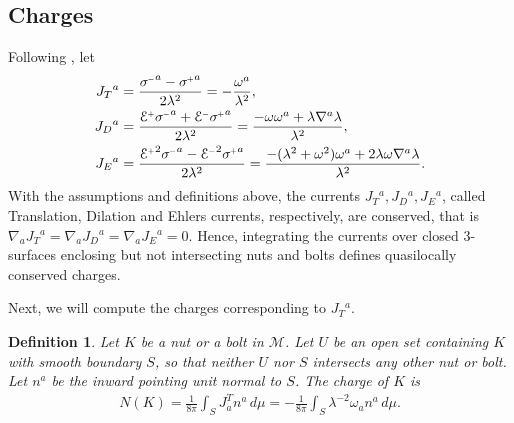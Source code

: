 \documentclass[a4paper,10pt,reqno]{amsart}
\newcommand{\cM}{\mathcal{M}}
\theoremstyle{plain}
\newtheorem{definition}[thm]{Definition}
\renewcommand{\P}[1]{{{#1}^{\hspace{-.5pt}\scaleto{+}{4pt}}}}
\newcommand{\M}[1]{{{#1}^{\hspace{-.5pt}\scaleto{-}{4pt}}}}
\def\Ecal{\mathcal{E}}
\numberwithin{equation}{section}
\begin{document}
\subsection{Charges} 

Following \cite[\S 5]{gibbons:hawking:1979}, let 
\begin{subequations}\label{eq:currents}
\begin{align}
J_{T}{}^{a}={}&\frac{\M{\sigma}^{a} -  \P{\sigma}^{a}}{2 \lambda^2} = - \frac{\omega^a}{\lambda^2}, \label{eq:JT-def} \\
J_{D}{}^{a}={}&\frac{\P{\Ecal} \M{\sigma}^{a} + \M{\Ecal} \P{\sigma}^{a}}{2 \lambda^2} = \frac{-\omega \omega^a + \lambda \nabla^a\lambda}{\lambda^2},\\
J_{E}{}^{a}={}&\frac{\P{\Ecal}^2 \M{\sigma}^{a} -  \M{\Ecal}^2 \P{\sigma}^{a}}{2 \lambda^2} = \frac{-(\lambda^2 + \omega^2)\omega^a + 2\lambda\omega\nabla^a\lambda}{\lambda^2} .
\end{align}
\end{subequations}
With the assumptions and definitions above, the currents $J_{T}{}^{a}, J_{D}{}^{a}, J_{E}{}^{a}$, called Translation, Dilation and Ehlers currents, respectively, are conserved, that is $\nabla_a J_{T}{}^{a} = \nabla_a J_{D}{}^{a} = \nabla_a J_{E}{}^{a} = 0$. Hence, integrating the currents over closed 3-surfaces enclosing but not intersecting nuts and bolts defines quasilocally conserved charges.  

Next, we will compute the charges corresponding to $J_T{}^a$.

\begin{definition}
Let $K$ be a nut or a bolt in $\cM$. Let $U$ be an open set containing $K$ with smooth boundary $S$, so that neither $U$ nor $S$ intersects any other nut or bolt. Let $n^a$ be the inward pointing unit normal to $S$. The charge of $K$ is 
\begin{align} \label{def:N(K)}
N(K) 
= \frac{1}{8\pi} \int_S J^T _a n^a \, d\mu
= -\frac{1}{8\pi} \int_S \lambda^{-2} \omega_a n^a \, d\mu.
\end{align}
\end{definition} 
\end{document}
